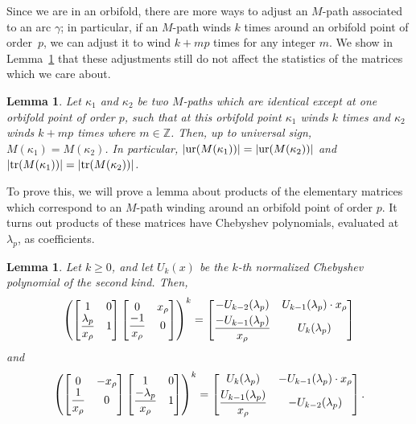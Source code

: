 \documentclass[pdftex]{sigma}%
\newcommand{\Z}{\mathbb{Z}}
\numberwithin{equation}{section}
\newtheorem{Lemma}[Theorem]{Lemma}
\begin{document}
Since we are in an orbifold, there are more ways to adjust an $M$-path associated to an arc $\gamma$; in particular, if an $M$-path winds $k$ times around an orbifold point of order~$p$, we can adjust it to wind $k + m p$ times for any integer $m$. We show in Lemma~\ref{lem:Mpathdontcare} that these adjustments still do not affect the statistics of the matrices which we care about.

\begin{Lemma}\label{lem:Mpathdontcare}
Let $\kappa_1$ and $\kappa_2$ be two $M$-paths which are identical except at one orbifold point of order $p$, such that at this orbifold point $\kappa_1$ winds $k$ times and $\kappa_2$ winds $k + mp$ times where $m \in \Z$. Then, up to universal sign, $M(\kappa_1) = M(\kappa_2)$. In particular, $\vert {\rm ur}(M(\kappa_1)) \vert = \vert {\rm ur}(M(\kappa_2))\vert$ and $\vert {\rm tr}(M(\kappa_1)) \vert = \vert {\rm tr}(M(\kappa_2)) \vert $.
\end{Lemma}

To prove this, we will prove a lemma about products of the elementary matrices which correspond to an $M$-path winding around an orbifold point of order $p$. It turns out products of these matrices have Chebyshev polynomials, evaluated at~$\lambda_p$, as coefficients.

\begin{Lemma} \label{lem:ChebyshevMatrices}
Let $k \geq 0$, and let $U_k(x)$ be the $k$-th normalized Chebyshev polynomial of the second kind. Then,
\begin{equation}\label{eqn:chebymatrix}
\left( \begin{bmatrix} 1 & 0 \\ \dfrac{\lambda_p}{x_\rho} & 1 \end{bmatrix} \begin{bmatrix} 0 & x_\rho \\ \dfrac{-1}{x_\rho} & 0 \end{bmatrix} \right)^k = \begin{bmatrix} -U_{k-2} (\lambda_p) & U_{k-1}(\lambda_p) \cdot x_\rho \vspace{1mm}\\ \dfrac{-U_{k-1}(\lambda_p)}{x_\rho} & U_k(\lambda_p) \end{bmatrix}
\end{equation}
and
\begin{equation}\label{eqn:negchebymatrix}
\left( \begin{bmatrix} 0 & -x_\rho \\ \dfrac{1}{x_\rho} & 0 \end{bmatrix} \begin{bmatrix} 1 & 0 \\ \dfrac{-\lambda_p}{x_\rho} & 1 \end{bmatrix} \right)^k = \begin{bmatrix} U_{k} (\lambda_p) & -U_{k-1}(\lambda_p) \cdot x_\rho \vspace{1mm}\\ \dfrac{U_{k-1}(\lambda_p)}{x_\rho} & -U_{k-2}(\lambda_p) \end{bmatrix}.
\end{equation}
\end{Lemma}
\end{document}
